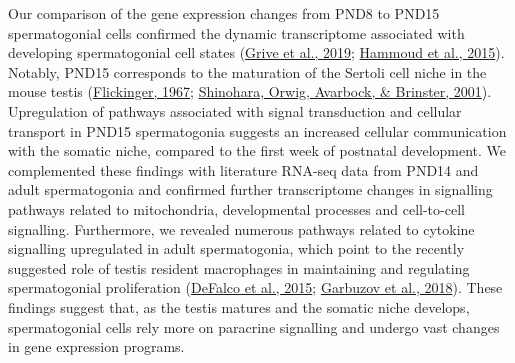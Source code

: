 \documentclass[12pt,twoside]{reedthesis}
\begin{document}
Our comparison of the gene expression changes from PND8 to PND15
spermatogonial cells confirmed the dynamic transcriptome associated with
developing spermatogonial cell states (\protect\hyperlink{ref-grive2019}{Grive et al., 2019}; \protect\hyperlink{ref-hammoud2015}{Hammoud et al., 2015}).
Notably, PND15 corresponds to the maturation of the Sertoli cell niche
in the mouse testis (\protect\hyperlink{ref-flickinger1967}{Flickinger, 1967}; \protect\hyperlink{ref-shinohara2001}{Shinohara, Orwig, Avarbock, \& Brinster, 2001}). Upregulation of
pathways associated with signal transduction and cellular transport in
PND15 spermatogonia suggests an increased cellular communication with
the somatic niche, compared to the first week of postnatal development.
We complemented these findings with literature RNA-seq data from PND14
and adult spermatogonia and confirmed further transcriptome changes in
signalling pathways related to mitochondria, developmental processes and
cell-to-cell signalling. Furthermore, we revealed numerous pathways
related to cytokine signalling upregulated in adult spermatogonia, which
point to the recently suggested role of testis resident macrophages in
maintaining and regulating spermatogonial proliferation (\protect\hyperlink{ref-defalco2015}{DeFalco et al., 2015}; \protect\hyperlink{ref-garbuzov2018}{Garbuzov et al., 2018}). These findings suggest that, as the testis matures and
the somatic niche develops, spermatogonial cells rely more on paracrine
signalling and undergo vast changes in gene expression programs.
\end{document}
